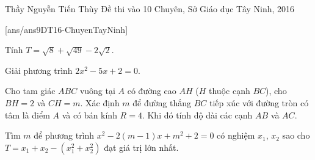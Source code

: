 \begin{name}
{Thầy  Nguyễn Tiến Thùy}
{Đề thi vào 10 Chuyên, Sở Giáo dục Tây Ninh, 2016}
\end{name}
\setcounter{ex}{0}
[ans/ans9DT16-ChuyenTayNinh]
\begin{ex}%
	Tính $T=\sqrt{8}+\sqrt{49}-2\sqrt{2}$.
\end{ex}

\begin{ex}%
	Giải phương trình $2x^2-5x+2=0$.
\end{ex}

\begin{ex}%
    Cho tam giác $ABC$ vuông tại $A$ có đường cao $AH$ ($H$ thuộc cạnh $BC$), cho $BH=2$ và $CH=m$. Xác định $m$ để đường thẳng $BC$ tiếp xúc với đường tròn có tâm là điểm $A$ và có bán kính $R=4$. Khi đó tính độ dài các cạnh $AB$ và $AC$.
\end{ex}

\begin{ex}%
    Tìm $m$ để phương trình $x^2-2(m-1)x+m^2+2=0$ có nghiệm $x_1$, $x_2$ sao cho $T=x_1+x_2-(x_1^2+x_2^2)$ đạt giá trị lớn nhất.
\end{ex}

